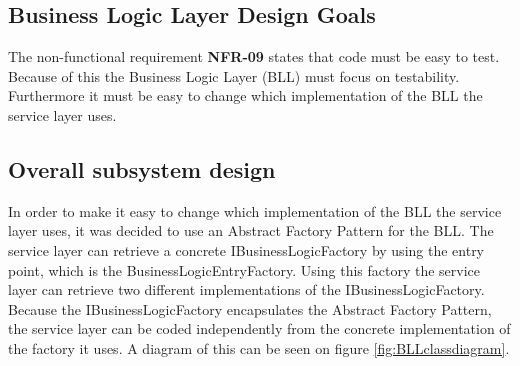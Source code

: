 \documentclass[../report.tex]{subfiles}
\begin{document}
\graphicspath{{img/}{../img/}}

\subsection{Business Logic Layer Design Goals}
The non-functional requirement \textbf{NFR-09} states that code must be easy to test. 
Because of this the Business Logic Layer (BLL) must focus on testability.
Furthermore it must be easy to change which implementation of the BLL the service layer uses. 

\subsection{Overall subsystem design}
In order to make it easy to change which implementation of the BLL the service layer uses, it was decided to use an Abstract Factory Pattern for the BLL.
The service layer can retrieve a concrete IBusinessLogicFactory by using the entry point, which is the BusinessLogicEntryFactory. 
Using this factory the service layer can retrieve two different implementations of the IBusinessLogicFactory. 
Because the IBusinessLogicFactory encapsulates the Abstract Factory Pattern, the service layer can be coded independently from the concrete implementation of the factory it uses.
A diagram of this can be seen on figure \ref{fig:BLLclassdiagram}.
\end{document}
